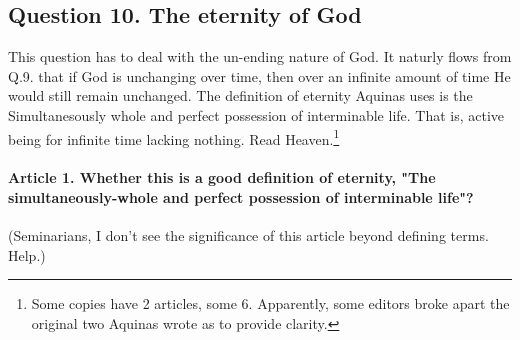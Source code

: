 \documentclass{ucetd}
\begin{document}
\subsection{Question 10. The eternity of God}
This question has to deal with the un-ending nature of God. It naturly flows from Q.9. that if God is unchanging over time, then over an infinite amount of time He would still remain unchanged. The definition of eternity Aquinas uses is the Simultanesously whole and perfect possession of interminable life. That is, active being for infinite time lacking nothing. Read Heaven.\footnote{Some copies have 2 articles, some 6. Apparently, some editors broke apart the original two Aquinas wrote as to provide clarity.}

\paragraph{Article 1. Whether this is a good definition of eternity, "The simultaneously-whole and perfect possession of interminable life"?}
(Seminarians, I don't see the significance of this article beyond defining terms. Help.)
\end{document}
